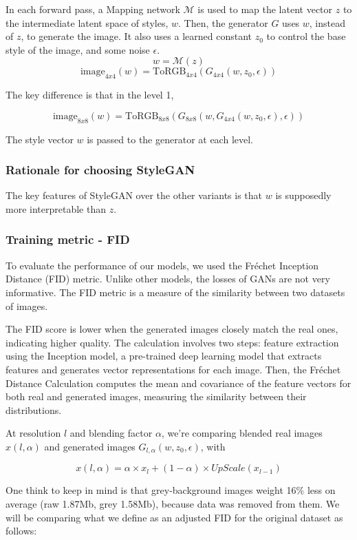 \documentclass{article}
\begin{document}
In each forward pass, a Mapping network $\mathcal{M}$ is used to map the latent vector $z$ to the intermediate latent space of styles, $w$.
Then, the generator $G$ uses $w$, instead of $z$, to generate the image. It also uses a learned constant $z_0$ to control the base style of the image, and some noise $\epsilon$.
\[w = \mathcal{M}(z)\]
\[\text{image}_{4x4}(w) = \text{ToRGB}_{4x4}(G_{4x4}(w, z_0, \epsilon))\]

The key difference is that in the level 1, 

\[\text{image}_{8x8}(w) = \text{ToRGB}_{8x8}(G_{8x8}(w, G_{4x4}(w, z_0, \epsilon), \epsilon))\]

The style vector $w$ is passed to the generator at each level.

\subsubsection*{Rationale for choosing StyleGAN}

The key features of StyleGAN over the other variants is that $w$ is supposedly more interpretable than $z$.

\subsubsection*{Training metric - FID}

\quad To evaluate the performance of our models, we used the Fréchet Inception Distance (FID) metric. Unlike other models, the losses of GANs are not very informative. The FID metric is a measure of the similarity between two datasets of images. 

The FID score is lower when the generated images closely match the real ones, indicating higher quality. 
The calculation involves two steps: feature extraction using the Inception model, a pre-trained deep learning model that extracts features and generates vector representations for each image. 
Then, the Fréchet Distance Calculation computes the mean and covariance of the feature vectors for both real and generated images, measuring the similarity between their distributions.

At resolution $l$ and blending factor $\alpha$, we're comparing blended real images $x(l, \alpha)$ and generated images $G_{l, \alpha}(w, z_0, \epsilon)$, with

\[ x(l, \alpha) = \alpha \times x_{l} + (1-\alpha) \times UpScale(x_{l-1}) \]

One think to keep in mind is that grey-background images weight 16\% less on average (raw 1.87Mb, grey 1.58Mb), because data was removed from them. We will be comparing what we define as an adjusted FID for the original dataset as follows:
\end{document}
